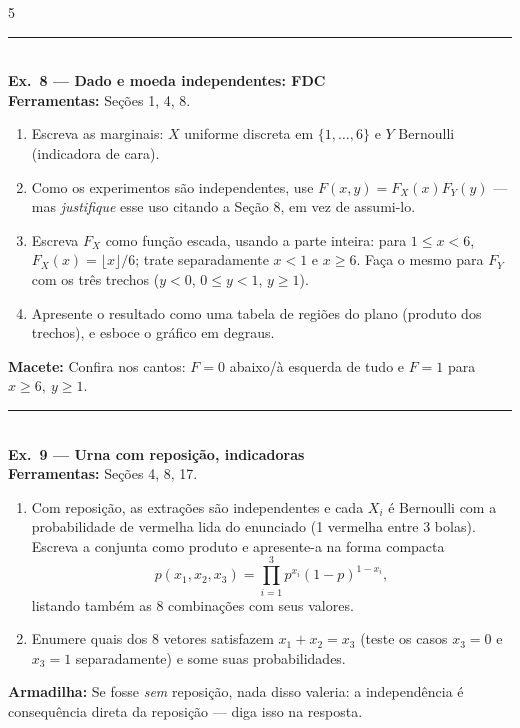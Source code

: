 \documentclass[a4paper,8pt]{extarticle}
\newcommand{\tit}[1]{\vspace{2pt}\textcolor{azul}{\rule{\linewidth}{0.6pt}}\\[1pt]\textbf{\textcolor{azul}{#1}}\\[1pt]}
\newcommand{\mac}[1]{\textcolor{verde}{\textbf{Macete:}} #1\par}
\newcommand{\arm}[1]{\textcolor{vinho}{\textbf{Armadilha:}} #1\par}
\newcommand{\ferr}[1]{\textbf{Ferramentas:} #1\par}
\begin{document}
\begin{multicols*}{5}
\tit{Ex.\ 8 — Dado e moeda independentes: FDC}
\ferr{Seções 1, 4, 8.}
\begin{enumerate}
\item Escreva as marginais: $X$ uniforme discreta em $\{1,\dots,6\}$ e $Y$ Bernoulli (indicadora de cara).
\item Como os experimentos são independentes, use $F(x,y)=F_X(x)F_Y(y)$ — mas \emph{justifique} esse uso citando a Seção 8, em vez de assumi-lo.
\item Escreva $F_X$ como função escada, usando a parte inteira: para $1\le x<6$, $F_X(x)=\lfloor x\rfloor/6$; trate separadamente $x<1$ e $x\ge6$. Faça o mesmo para $F_Y$ com os três trechos ($y<0$, $0\le y<1$, $y\ge1$).
\item Apresente o resultado como uma tabela de regiões do plano (produto dos trechos), e esboce o gráfico em degraus.
\end{enumerate}
\mac{Confira nos cantos: $F=0$ abaixo/à esquerda de tudo e $F=1$ para $x\ge6,\ y\ge1$.}

\tit{Ex.\ 9 — Urna com reposição, indicadoras}
\ferr{Seções 4, 8, 17.}
\begin{enumerate}
\item[(a)] Com reposição, as extrações são independentes e cada $X_i$ é Bernoulli com a probabilidade de vermelha lida do enunciado (1 vermelha entre 3 bolas). Escreva a conjunta como produto e apresente-a na forma compacta
\[p(x_1,x_2,x_3)=\prod_{i=1}^{3}p^{x_i}(1-p)^{1-x_i},\]
listando também as 8 combinações com seus valores.
\item[(b)] Enumere quais dos 8 vetores satisfazem $x_1+x_2=x_3$ (teste os casos $x_3=0$ e $x_3=1$ separadamente) e some suas probabilidades.
\end{enumerate}
\arm{Se fosse \emph{sem} reposição, nada disso valeria: a independência é consequência direta da reposição — diga isso na resposta.}


\end{multicols*}
\end{document}
